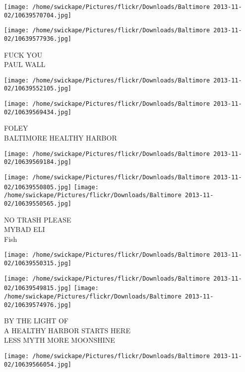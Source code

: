 \documentclass[10pt,letterpaper]{article}
\begin{document}
\texttt{[image: /home/swickape/Pictures/flickr/Downloads/Baltimore 2013-11-02/10639570704.jpg]}

\vspace{0.25in}
\texttt{[image: /home/swickape/Pictures/flickr/Downloads/Baltimore 2013-11-02/10639577936.jpg]}

FUCK YOU\\
PAUL WALL\\
\pagebreak

\texttt{[image: /home/swickape/Pictures/flickr/Downloads/Baltimore 2013-11-02/10639552105.jpg]}

\vspace{0.25in}
\texttt{[image: /home/swickape/Pictures/flickr/Downloads/Baltimore 2013-11-02/10639569434.jpg]}

FOLEY\\
BALTIMORE HEALTHY HARBOR\\
\pagebreak

\texttt{[image: /home/swickape/Pictures/flickr/Downloads/Baltimore 2013-11-02/10639569184.jpg]}

\vspace{0.25in}
\texttt{[image: /home/swickape/Pictures/flickr/Downloads/Baltimore 2013-11-02/10639550805.jpg]}
\texttt{[image: /home/swickape/Pictures/flickr/Downloads/Baltimore 2013-11-02/10639550565.jpg]}

NO TRASH PLEASE\\
MYBAD ELI\\
Fish\\
\pagebreak

\texttt{[image: /home/swickape/Pictures/flickr/Downloads/Baltimore 2013-11-02/10639550315.jpg]}

\vspace{0.25in}
\texttt{[image: /home/swickape/Pictures/flickr/Downloads/Baltimore 2013-11-02/10639549815.jpg]}
\texttt{[image: /home/swickape/Pictures/flickr/Downloads/Baltimore 2013-11-02/10639574976.jpg]}

BY THE LIGHT OF\\
A HEALTHY HARBOR STARTS HERE\\
LESS MYTH MORE MOONSHINE\\
\pagebreak

\texttt{[image: /home/swickape/Pictures/flickr/Downloads/Baltimore 2013-11-02/10639566054.jpg]}
\end{document}

